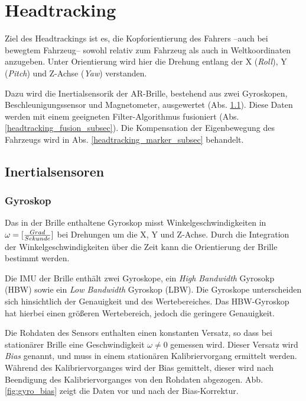 
\section{Headtracking}

Ziel des Headtrackings ist es, die Kopforientierung des Fahrers --auch bei bewegtem  Fahrzeug-- sowohl relativ zum Fahrzeug als auch in Weltkoordinaten anzugeben. Unter Orientierung wird hier die Drehung entlang der X (\emph{Roll}), Y (\emph{Pitch}) und Z-Achse (\emph{Yaw}) verstanden.

Dazu wird die Inertialsensorik der \ac{AR}-Brille, bestehend aus zwei Gyroskopen, Beschleunigungssensor und Magnetometer, ausgewertet (Abs. \ref{headtracking_imu_subsec}).
Diese Daten werden mit einem geeigneten Filter-Algorithmus fusioniert (Abs. \ref{headtracking_fusion_subsec}).
Die Kompensation der Eigenbewegung des Fahrzeugs wird in Abs. \ref{headtracking_marker_subsec} behandelt.


\subsection{Inertialsensoren}
\label{headtracking_imu_subsec}


\subsubsection{Gyroskop}
\label{headtracking_imu_gyro_subsubsec}

Das in der Brille enthaltene Gyroskop misst Winkelgeschwindigkeiten in
$\omega = [{Grad \over Sekunde}]$ bei Drehungen um die X, Y und Z-Achse. Durch
die Integration der Winkelgeschwindigkeiten über die Zeit kann die
Orientierung der Brille bestimmt werden.  

Die IMU der Brille enthält zwei
Gyroskope, ein \emph{High Bandwidth} Gyrosokp (HBW) sowie ein
\emph{Low Bandwidth} Gyroskop (LBW). Die Gyroskope unterscheiden sich
hinsichtlich der Genauigkeit und des Wertebereiches. Das HBW-Gyroskop
hat hierbei einen größeren Wertebereich, jedoch die geringere
Genauigkeit.

Die Rohdaten des Sensors enthalten einen konstanten Versatz, so dass bei
stationärer Brille eine Geschwindigkeit $\omega \neq 0$ gemessen wird. Dieser
Versatz wird \emph{Bias} genannt, und muss in einem stationären
Kalibriervorgang ermittelt werden. Während des Kalibriervorganges wird
der Bias gemittelt, dieser wird nach Beendigung des Kalibriervorganges von den
Rohdaten abgezogen. Abb. \ref{fig:gyro_bias} zeigt die Daten vor und nach der
Bias-Korrektur.


